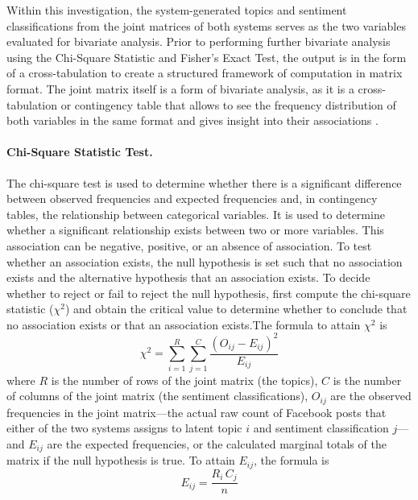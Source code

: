 Within this investigation, the system-generated topics and sentiment
classifications from the joint matrices of both systems serves as the two variables evaluated for bivariate analysis. Prior to performing further
bivariate analysis using the Chi-Square Statistic and Fisher's Exact Test, the output
is in the form of a cross-tabulation to create a structured framework of
computation in matrix format. The joint matrix itself is a form of bivariate
analysis, as it is a cross-tabulation or contingency table that allows to
see the frequency distribution of both variables in the same format and gives
insight into their associations \parencite{ben2024bivariate}.

\paragraph{Chi-Square Statistic Test.} The chi-square test is used to determine
whether there is a significant difference between observed frequencies and
expected frequencies and, in contingency tables, the relationship between
categorical variables. It is used to determine whether a significant
relationship exists between two or more variables. This association can be
negative, positive, or an absence of association. To test whether an association
exists, the null hypothesis is set such that no association exists and the
alternative hypothesis that an association exists. To decide whether to reject
or fail to reject the null hypothesis, first compute the chi-square statistic
($\chi^2$) and obtain the critical value to determine whether to conclude that
no association exists or that an association exists.The formula to attain $\chi^2$ is
\begin{equation}
	\chi^2 = \sum_{i=1}^{R} \sum_{j=1}^{C}
	\frac{\left(O_{ij} - E_{ij}\right)^2}{E_{ij}}
	\label{eq:chisq}
\end{equation}
where $R$ is the number of rows of the joint matrix (the topics), $C$ is
the number of columns of the joint matrix (the sentiment classifications),
$O_{ij}$ are the observed frequencies in the joint matrix---the actual raw count
of Facebook posts that either of the two systems assigns to latent topic $i$ and
sentiment classification $j$---and $E_{ij}$ are the expected frequencies, or
the calculated marginal totals of the matrix if the null hypothesis is true. To
attain $E_{ij}$, the formula is
\begin{equation}
	E_{ij} = \frac{R_i \, C_j}{n}
	\label{eq:expected}
\end{equation}

